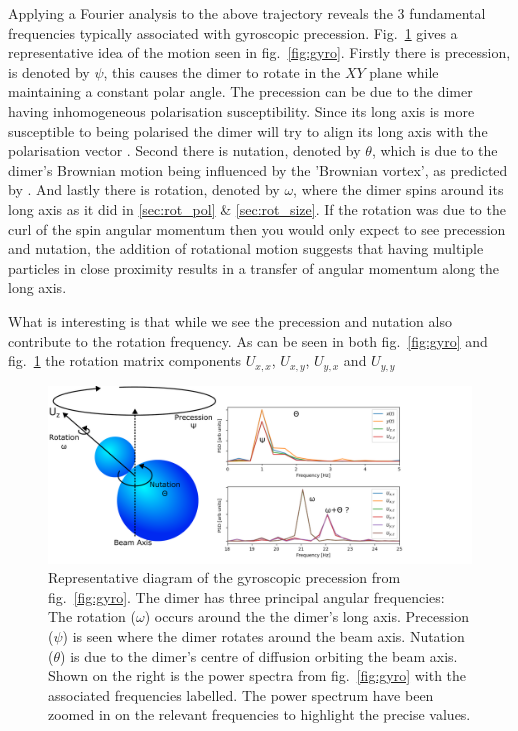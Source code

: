 Applying a Fourier analysis to the above trajectory reveals 
the 3 fundamental frequencies typically associated with 
gyroscopic precession. Fig.~\ref{fig:gyro_diagram} gives 
a representative idea of the motion seen in fig.~\ref{fig:gyro}.
Firstly there is precession, is denoted by $\psi$, this
causes the dimer to rotate in the $XY$ plane while maintaining
a constant polar angle. The precession can be due to the dimer 
having inhomogeneous polarisation susceptibility. Since its 
long axis is more susceptible to being polarised the dimer will
try to align its long axis with the polarisation vector 
\cite{Bruce2020}. Second there is nutation, denoted by $\theta$, 
which is due to the dimer's Brownian motion being influenced by 
the 'Brownian vortex', as predicted by \cite{Ruffner2012}. And 
lastly there is rotation, denoted by $\omega$, where the dimer
spins around its long axis as it did in \ref{sec:rot_pol} \&
\ref{sec:rot_size}. If the rotation was due to the curl of the 
spin angular momentum then you would only expect to see 
precession and nutation, the addition of rotational motion 
suggests that having multiple particles in close proximity 
results in a transfer of angular momentum along the long 
axis.
 
What is interesting is that while we see the precession and 
nutation also contribute to the rotation frequency. As can be 
seen in both fig.~\ref{fig:gyro} and fig.~\ref{fig:gyro_diagram}
the rotation matrix components $U_{x,x}$, $U_{x,y}$, $U_{y,x}$
and $U_{y,y}$
\begin{figure}[h!]
	\hspace{-2.3cm}
	\includegraphics[width=1.2\linewidth]{gyroscopic_diagram.pdf}
	\caption{Representative diagram of the gyroscopic precession 
	from fig.~\ref{fig:gyro}. The dimer has three principal angular
	frequencies: The rotation ($\omega$) occurs around the 
	the dimer's long axis. Precession ($\psi$) is seen where the dimer 
	rotates around the beam axis. Nutation ($\theta$) is due to the dimer's 
	centre of diffusion orbiting the beam axis. Shown on the right
	is the power spectra from fig.~\ref{fig:gyro} with the associated 
	frequencies labelled. The power spectrum have been zoomed in on
	the relevant frequencies to highlight the precise values.}
	\label{fig:gyro_diagram}
\end{figure}

